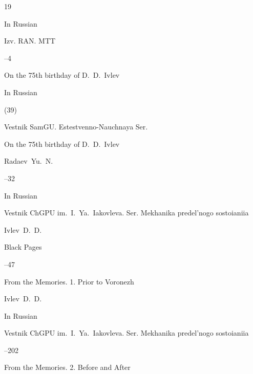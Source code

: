 \begin{thebibliography}{19}




\lang In Russian



\jour Izv. RAN. MTT

--4

\paper  On the 75th birthday of D.~D.~Ivlev




\lang In Russian


(39)

\jour Vestnik SamGU. Estestvenno-Nauchnaya Ser.

\paper On the 75th birthday of D.~D.~Ivlev

\by Radaev~Yu.~N.

--32










\lang In Russian

\jour Vestnik \mbox{ChGPU} im.~I.~Ya.~Iakovleva. Ser. Mekhanika predel'nogo sostoianiia



\by Ivlev~D.~D.

\paper Black Pages

--47






\paper From the Memories. 1. Prior to Voronezh

\by Ivlev~D.~D.

\lang In Russian

\jour Vestnik \mbox{ChGPU} im.~I.~Ya.~Iakovleva. Ser. Mekhanika predel'nogo sostoianiia



--202






\paper From the Memories. 2. Before and After


\end{thebibliography}

